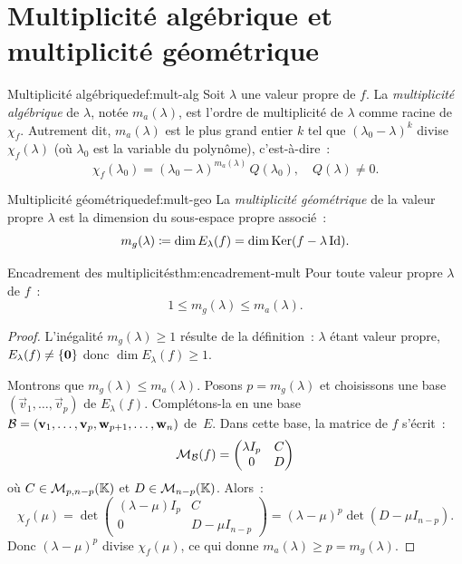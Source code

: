 \section{Multiplicité algébrique et multiplicité géométrique}\label{sec:multiplicites}

\begin{definition}{Multiplicité algébrique}{def:mult-alg}
  Soit $\lambda$ une valeur propre de $f$. La \emph{multiplicité
  algébrique} de $\lambda$, notée $m_a(\lambda)$, est l'ordre de
  multiplicité de $\lambda$ comme racine de $\chi_f$. Autrement dit,
  $m_a(\lambda)$ est le plus grand entier $k$ tel que
  $(\lambda_0-\lambda)^k$ divise $\chi_f(\lambda)$ (où $\lambda_0$
  est la variable du polynôme), c'est-à-dire~:
  \[
    \chi_f(\lambda_0)=(\lambda_0-\lambda)^{m_a(\lambda)}\,Q(\lambda_0),
    \quad Q(\lambda)\neq 0.
  \]
\end{definition}

\begin{definition}{Multiplicité géométrique}{def:mult-geo}
  La \emph{multiplicité géométrique} de la valeur propre $\lambda$
  est la dimension du sous-espace propre associé~:
  \[
    m_g(\lambda)\coloneqq\dim E_\lambda(f)=\dim\operatorname{Ker}(f-\lambda\operatorname{Id}).
  \]
\end{definition}

\begin{theorem}{Encadrement des multiplicités}{thm:encadrement-mult}
  Pour toute valeur propre $\lambda$ de $f$~:
  \[
    1\leq m_g(\lambda)\leq m_a(\lambda).
  \]
\end{theorem}

\begin{proof}
  L'inégalité $m_g(\lambda)\geq 1$ résulte de la définition~: $\lambda$
  étant valeur propre, $E_\lambda(f)\neq\left\{\mathbf{0}\right\}$ donc
  $\dim E_\lambda(f)\geq 1$.

  Montrons que $m_g(\lambda)\leq m_a(\lambda)$. Posons $p=m_g(\lambda)$
  et choisissons une base $(\vec{v}_1,\ldots,\vec{v}_p)$ de
  $E_\lambda(f)$. Complétons-la en une base
  ${\mathcal{B}}=(\mathbf{v}_1,\ldots,\mathbf{v}_p,\mathbf{w}_{p+1},\ldots,\mathbf{w}_n)$
  de~$E$. Dans cette base, la matrice de $f$ s'écrit~:
  \[
    \mathcal{M}_{\mathcal{B}}(f)=\begin{pmatrix}\lambda I_p & C \\ 0 & D\end{pmatrix}
  \]
  où $C\in\mathcal{M}_{p,n-p}({\mathbb{K}})$ et $D\in\mathcal{M}_{n-p}({\mathbb{K}})$. Alors~:
  \[
    \chi_f(\mu)=\det\begin{pmatrix}(\lambda-\mu)I_p & C \\ 0 & D-\mu I_{n-p}
    \end{pmatrix}=(\lambda-\mu)^p\det(D-\mu I_{n-p}).
  \]
  Donc $(\lambda-\mu)^p$ divise $\chi_f(\mu)$, ce qui donne
  $m_a(\lambda)\geq p=m_g(\lambda)$.
\end{proof}

